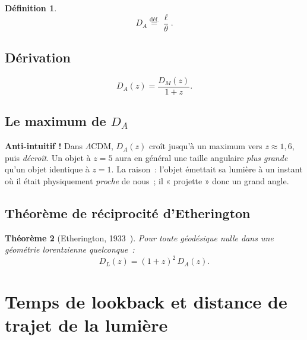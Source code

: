 \documentclass[11pt,a4paper,openany]{report}
\newcommand{\eqdef}{\stackrel{\text{déf.}}{=}}
\newtheorem{theorem}{Théorème}[chapter]
\newtheorem{definition}[theorem]{Définition}
\begin{document}
\begin{definition}
\begin{equation}
D_{A} \eqdef \frac{\ell}{\theta}.
\label{eq:DA_def}
\end{equation}
\end{definition}

\section{Dérivation}

\begin{equation}
\boxed{\;D_{A}(z) = \frac{D_{M}(z)}{1+z}.\;}
\label{eq:DA}
\end{equation}

\section{Le maximum de \texorpdfstring{$D_{A}$}{D\_A}}

\begin{tcolorbox}[attention]
\textbf{Anti-intuitif !} Dans $\Lambda$CDM, $D_{A}(z)$ croît jusqu'à un
maximum vers $z \approx 1{,}6$, puis \emph{décroît}. Un objet à $z = 5$ aura
en général une taille angulaire \emph{plus grande} qu'un objet identique à
$z = 1$. La raison~: l'objet émettait sa lumière à un instant où il était
physiquement \emph{proche} de nous~; il « projette » donc un grand angle.
\end{tcolorbox}

\section{Théorème de réciprocité d'Etherington}

\begin{theorem}[Etherington, 1933~\cite{Etherington1933}]
Pour toute géodésique nulle dans une géométrie lorentzienne quelconque~:
\begin{equation}
\boxed{\;D_{L}(z) = (1+z)^{2}\,D_{A}(z).\;}
\label{eq:Etherington}
\end{equation}
\end{theorem}

\chapter{Temps de lookback et distance de trajet de la lumière}
\label{chap:Dlt}
\end{document}
